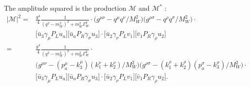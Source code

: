 \noindent The amplitude squared is the production $\mathcal{M}$  and $\mathcal{M^*} $ :
\begin{equation}
\begin{split}
	|\mathcal{M}|^2  = &  \frac{g^4}{4} \frac{1}{ (q^2-m^2_{W})^2 +  m^2_W \Gamma^2_W } \cdot \big (g^{\mu \nu} - q^\mu q^\nu/M^2_{W} \big) \big(g^{\rho \sigma} - q^\rho q^\sigma / M^2_{W}\big)  \cdot  \\
    &\big[ \bar{u}_3 \gamma_\mu P_L u_a \big]  \big[ \bar{u}_a P_R \gamma_\sigma  u_3 \big] \cdot \big[ \bar{u}_2 \gamma_\nu P_L v_1 \big]  \big[ \bar{v}_1 P_R \gamma_\rho  u_2 \big] \\
    = & \frac{g^4}{4} \frac{1}{ (q^2-m^2_{W})^2 +  m^2_W \Gamma^2_W } \cdot \\
    & \big (g^{\mu \nu} - (p_a^\mu-k_3^\mu) (k_1^\nu+k_2^\nu) /M^2_{W} \big) \big(g^{\rho \sigma} - (k_1^\rho+k_2^\rho) (p_a^\sigma -k_3^\sigma )/ M^2_{W}\big)  \cdot \\
    & \big[ \bar{u}_3 \gamma_\mu P_L u_a \big]  \big[ \bar{u}_a P_R \gamma_\sigma  u_3 \big] \cdot \big[ \bar{u}_2 \gamma_\nu P_L v_1 \big]  \big[ \bar{v}_1 P_R \gamma_\rho  u_2 \big] .
\end{split}
\end{equation}

